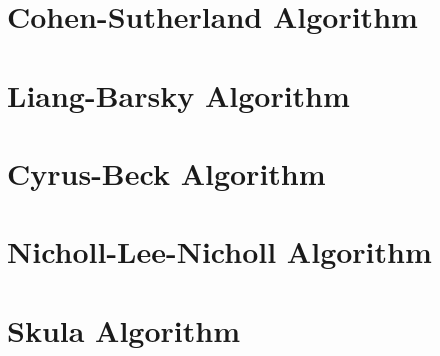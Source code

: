 \documentclass{article}
\begin{document}


\section{Cohen-Sutherland Algorithm}



\section{Liang-Barsky Algorithm}



\section{Cyrus-Beck Algorithm}



\section{Nicholl-Lee-Nicholl Algorithm}



\section{Skula Algorithm}





\end{document}
